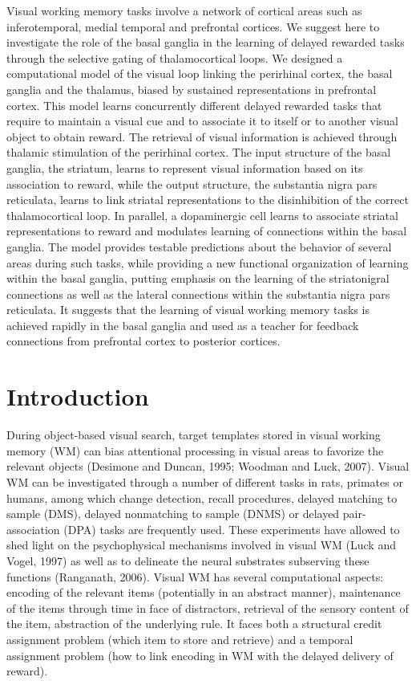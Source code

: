 \documentclass[
  11pt,
  a4paper,
]{scrbook}
\begin{document}
Visual working memory tasks involve a network of cortical areas such as
inferotemporal, medial temporal and prefrontal cortices. We suggest here
to investigate the role of the basal ganglia in the learning of delayed
rewarded tasks through the selective gating of thalamocortical loops. We
designed a computational model of the visual loop linking the perirhinal
cortex, the basal ganglia and the thalamus, biased by sustained
representations in prefrontal cortex. This model learns concurrently
different delayed rewarded tasks that require to maintain a visual cue
and to associate it to itself or to another visual object to obtain
reward. The retrieval of visual information is achieved through thalamic
stimulation of the perirhinal cortex. The input structure of the basal
ganglia, the striatum, learns to represent visual information based on
its association to reward, while the output structure, the substantia
nigra pars reticulata, learns to link striatal representations to the
disinhibition of the correct thalamocortical loop. In parallel, a
dopaminergic cell learns to associate striatal representations to reward
and modulates learning of connections within the basal ganglia. The
model provides testable predictions about the behavior of several areas
during such tasks, while providing a new functional organization of
learning within the basal ganglia, putting emphasis on the learning of
the striatonigral connections as well as the lateral connections within
the substantia nigra pars reticulata. It suggests that the learning of
visual working memory tasks is achieved rapidly in the basal ganglia and
used as a teacher for feedback connections from prefrontal cortex to
posterior cortices.

\section{Introduction}\label{introduction-1}

During object-based visual search, target templates stored in visual
working memory (WM) can bias attentional processing in visual areas to
favorize the relevant objects (Desimone and Duncan, 1995; Woodman and
Luck, 2007). Visual WM can be investigated through a number of different
tasks in rats, primates or humans, among which change detection, recall
procedures, delayed matching to sample (DMS), delayed nonmatching to
sample (DNMS) or delayed pair-association (DPA) tasks are frequently
used. These experiments have allowed to shed light on the psychophysical
mechanisms involved in visual WM (Luck and Vogel, 1997) as well as to
delineate the neural substrates subserving these functions (Ranganath,
2006). Visual WM has several computational aspects: encoding of the
relevant items (potentially in an abstract manner), maintenance of the
items through time in face of distractors, retrieval of the sensory
content of the item, abstraction of the underlying rule. It faces both a
structural credit assignment problem (which item to store and retrieve)
and a temporal assignment problem (how to link encoding in WM with the
delayed delivery of reward).
\end{document}
